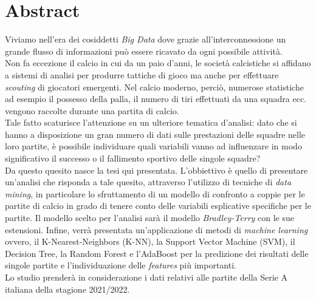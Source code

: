 
\cleardoublepage
{}
{}
\begingroup
\let\clearpage\relax
\let\cleardoublepage\relax
\let\cleardoublepage\relax

\chapter*{Abstract}

Viviamo nell'era dei cosiddetti \emph{Big Data} dove grazie all'interconnessione un grande flusso di informazioni può essere ricavato da ogni possibile attività. \\
Non fa eccezione il calcio in cui da un paio d'anni, le società calcistiche si affidano a sistemi di analisi per produrre tattiche di gioco ma anche per effettuare \textit{scouting} di giocatori emergenti. Nel calcio moderno, perciò, numerose statistiche ad esempio il possesso della palla, il numero di tiri effettuati da una squadra ecc. vengono raccolte durante una partita di calcio.\\
Tale fatto scaturisce l'attenzione su un ulteriore tematica d'analisi: dato che si hanno a disposizione un gran numero di dati sulle prestazioni delle squadre nelle loro partite, è possibile individuare quali variabili vanno ad influenzare in modo significativo il successo o il fallimento sportivo delle singole squadre? \\
Da questo quesito nasce la tesi qui presentata. L’obbiettivo è quello di presentare un'analisi che risponda a tale quesito, attraverso l'utilizzo di tecniche di \textit{data mining}, in particolare lo sfruttamento di un modello di confronto a coppie per le partite di calcio in grado di tenere conto delle variabili esplicative specifiche per le partite. Il modello scelto per l’analisi sarà il modello \emph{Bradley-Terry} con le sue estensioni. Infine, verrà presentata un’applicazione di metodi di \textit{machine learning} ovvero, il K-Nearest-Neighbors (K-NN), la Support Vector Machine (SVM), il Decision Tree, la Random Forest e l'AdaBoost per la predizione dei risultati delle singole partite e l'individuazione delle \emph{features} più importanti. \\
Lo studio prenderà in considerazione i dati relativi alle partite della Serie A italiana della stagione 2021/2022.






%
%

\endgroup			

\vfill

